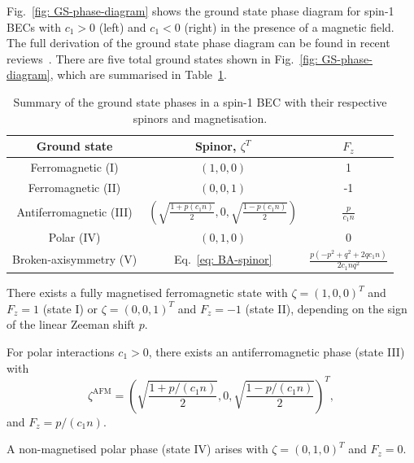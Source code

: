 Fig.~\ref{fig: GS-phase-diagram} shows the ground state phase diagram for spin-1
BECs with \(c_1 > 0\) (left) and \(c_1 < 0\) (right) in the presence of a
magnetic field.
The full derivation of the ground state phase diagram can be found in recent
reviews~\cite{Kawaguchi2012, StamperKurn2013}.
There are five total ground states shown in Fig.~\ref{fig: GS-phase-diagram},
which are summarised in Table~\ref{tab: spin-1-ground-states}.
\begin{table}
    \centering
    \begin{tabular}{ccc}
        \toprule
        Ground state                          & Spinor, \(\zeta^T\)                      & \(F_z\) \\
        \midrule
        Ferromagnetic (I)                     & \((1, 0, 0)\)                            & 1       \\
        Ferromagnetic (II)                    & \((0, 0, 1)\)                            & -1      \\
        Antiferromagnetic (III)               & \(\left(\sqrt{\frac{1 + p(c_1n)}{2}}, 0,
        \sqrt{\frac{1 - p(c_1n)}{2}}\right)\) & \(\frac{p}{c_1n}\)                                 \\
        Polar (IV)                            & \((0, 1, 0)\)                            & 0       \\
        Broken-axisymmetry (V)                & Eq.~\eqref{eq: BA-spinor}
                                              & \(\frac{p(-p^2+q^2+2qc_1n)}{2c_1nq^2}\)            \\
        \bottomrule
    \end{tabular}
    \caption{\label{tab: spin-1-ground-states}Summary of the ground state
        phases in a spin-1 BEC with their respective spinors and magnetisation.}
\end{table}

There exists a fully magnetised ferromagnetic state with \(\zeta={(1, 0, 0)}^T\)
and \(F_z=1\) (state I) or \(\zeta={(0, 0, 1)}^T\) and \(F_z=-1\) (state II),
depending on the sign of the linear Zeeman shift \(p\).

For polar interactions \(c_1 > 0\), there exists an antiferromagnetic phase
(state III) with
\begin{equation}
    \zeta^\mathrm{AFM} = {\left(\sqrt{\frac{1 + p/(c_1n)}{2}}, 0,
    \sqrt{\frac{1 - p/(c_1n)}{2}}\right)}^T,
\end{equation}
and \(F_z = p/(c_1n)\).

A non-magnetised polar phase (state IV) arises with \(\zeta={(0, 1, 0)}^T\) and
\(F_z = 0\).

